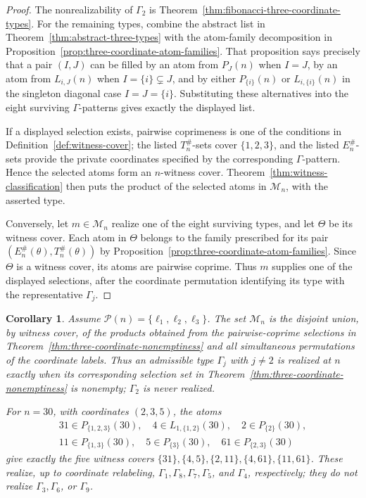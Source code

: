 \documentclass[11pt,letterpaper]{article}
\numberwithin{equation}{section}
\theoremstyle{plain}
\newtheorem{corollary}[theorem]{Corollary}
\theoremstyle{definition}
\theoremstyle{remark}
\begin{document}
\begin{proof}
The nonrealizability of \(\Gamma_2\) is
Theorem~\ref{thm:fibonacci-three-coordinate-types}. For the remaining types,
combine the abstract list in Theorem~\ref{thm:abstract-three-types} with the
atom-family decomposition in Proposition~\ref{prop:three-coordinate-atom-families}.
That proposition says precisely that a pair \((I,J)\) can be filled by an atom
from \(P_J(n)\) when \(I=J\), by an atom from \(L_{i,J}(n)\) when
\(I=\{i\}\subsetneq J\), and by either \(P_{\{i\}}(n)\) or
\(L_{i,\{i\}}(n)\) in the singleton diagonal case \(I=J=\{i\}\).
Substituting these alternatives into the eight surviving \(\Gamma\)-patterns
gives exactly the displayed list.

If a displayed selection exists, pairwise coprimeness is one of the conditions
in Definition~\ref{def:witness-cover}; the listed \(T_n^\#\)-sets cover
\(\{1,2,3\}\), and the listed \(E_n^\#\)-sets provide the private coordinates
specified by the corresponding \(\Gamma\)-pattern. Hence the selected atoms form
an \(n\)-witness cover. Theorem~\ref{thm:witness-classification} then puts the
product of the selected atoms in \(\mathcal M_n\), with the asserted type.

Conversely, let \(m\in\mathcal M_n\) realize one of the eight surviving types,
and let \(\Theta\) be its witness cover. Each atom in \(\Theta\) belongs to the
family prescribed for its pair \((E_n^\#(\theta),T_n^\#(\theta))\) by
Proposition~\ref{prop:three-coordinate-atom-families}. Since \(\Theta\) is a
witness cover, its atoms are pairwise coprime. Thus \(m\) supplies one of the
displayed selections, after the coordinate permutation identifying its type
with the representative \(\Gamma_j\).
\end{proof}

\begin{corollary}\label{cor:three-coordinate-realization}
Assume \(\mathcal P(n)=\{\ell_1,\ell_2,\ell_3\}\). The set
\(\mathcal M_n\) is the disjoint union, by witness cover, of the products
obtained from the pairwise-coprime selections in
Theorem~\ref{thm:three-coordinate-nonemptiness} and all simultaneous
permutations of the coordinate labels. Thus an admissible type
\(\Gamma_j\) with \(j\ne2\) is realized at \(n\) exactly when its corresponding
selection set in Theorem~\ref{thm:three-coordinate-nonemptiness} is nonempty;
\(\Gamma_2\) is never realized.

For \(n=30\), with coordinates \((2,3,5)\), the atoms
\[
\begin{gathered}
31\in P_{\{1,2,3\}}(30),\quad
4\in L_{1,\{1,2\}}(30),\quad
2\in P_{\{2\}}(30),\\
11\in P_{\{1,3\}}(30),\quad
5\in P_{\{3\}}(30),\quad
61\in P_{\{2,3\}}(30)
\end{gathered}
\]
give exactly the five witness covers
\(\{31\},\{4,5\},\{2,11\},\{4,61\},\{11,61\}\). These realize, up to
coordinate relabeling, \(\Gamma_1,\Gamma_8,\Gamma_7,\Gamma_5\), and
\(\Gamma_4\), respectively; they do not realize
\(\Gamma_3,\Gamma_6\), or \(\Gamma_9\).
\end{corollary}
\end{document}
